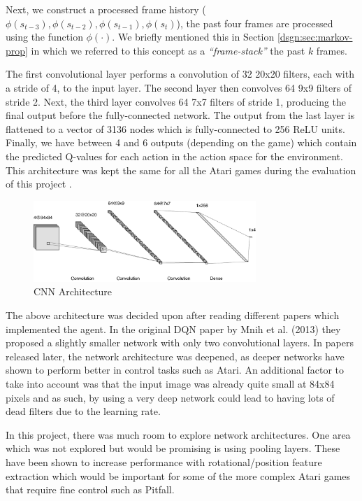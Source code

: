 Next, we construct a processed frame history ($\phi(s_{t-3}), \phi(s_{t-2}), \phi(s_{t-1}), \phi(s_t)$), the past four frames are processed using the function $\phi(\cdot)$. We briefly mentioned this in Section \ref{dsgn:sec:markov-prop} in which we referred to this concept as a \textit{``frame-stack''} the past $k$ frames.

The first convolutional layer performs a convolution of 32 20x20 filters, each with a stride of 4, to the input layer. The second layer then convolves 64 9x9 filters of stride 2. Next, the third layer convolves 64 7x7 filters of stride 1, producing the final output before the fully-connected network. The output from the last layer is flattened to a vector of 3136 nodes which is fully-connected to 256 ReLU units. Finally, we have between 4 and 6 outputs (depending on the game) which contain the predicted Q-values for each action in the action space for the environment. This architecture was kept the same for all the Atari games during the evaluation of this project \cite{dqn}.

\begin{figure}[htbp]
	\centering
	\includegraphics[width=0.75\textwidth]{chapters/chapter4/images/cnn.png}
	\caption{CNN Architecture
		\label{fig:project-dqn}
	}
\end{figure}

The above architecture was decided upon after reading different papers which implemented the agent. In the original DQN paper by Mnih et al. (2013) \cite{dqn} they proposed a slightly smaller network with only two convolutional layers. In papers released later, the network architecture was deepened, as deeper networks have shown to perform better in control tasks such as Atari. An additional factor to take into account was that the input image was already quite small at 84x84 pixels and as such, by using a very deep network could lead to having lots of dead filters due to the learning rate.

In this project, there was much room to explore network architectures. One area which was not explored but would be promising is using pooling layers. These have been shown to increase performance with rotational/position feature extraction which would be important for some of the more complex Atari games that require fine control such as Pitfall.

